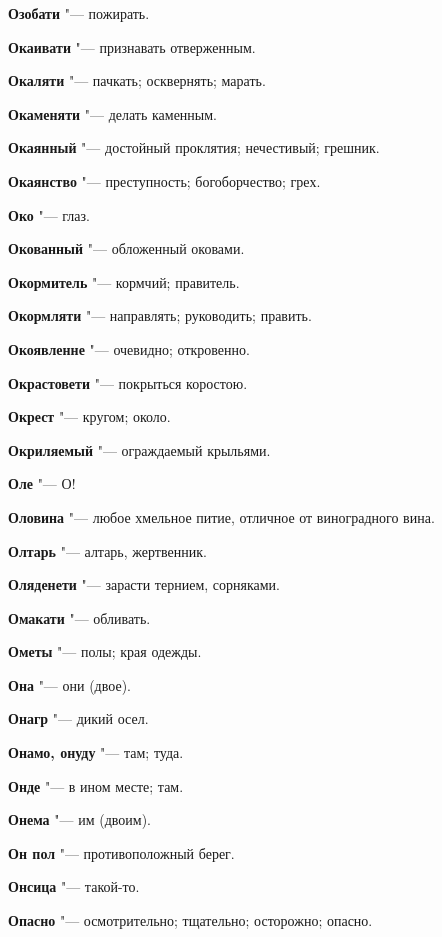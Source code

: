 \begin{mymulticols}
\noindent\textbf{Озобати} "--- пожирать. 

\noindent\textbf{Окаивати} "--- признавать отверженным. 

\noindent\textbf{Окаляти} "--- пачкать; осквернять; марать. 

\noindent\textbf{Окаменяти} "--- делать каменным. 

\noindent\textbf{Окаянный} "--- достойный проклятия; нечестивый; грешник. 

\noindent\textbf{Окаянство} "--- преступность; богоборчество; грех. 

\noindent\textbf{Око} "--- глаз. 

\noindent\textbf{Окованный} "--- обложенный оковами. 

\noindent\textbf{Окормитель} "--- кормчий; правитель. 

\noindent\textbf{Окормляти} "--- направлять; руководить; править. 

\noindent\textbf{Окоявленне} "--- очевидно; откровенно. 

\noindent\textbf{Окрастовети} "--- покрыться коростою. 

\noindent\textbf{Окрест} "--- кругом; около. 

\noindent\textbf{Окриляемый} "--- ограждаемый крыльями. 

\noindent\textbf{Оле} "--- О! 

\noindent\textbf{Оловина} "--- любое хмельное питие, отличное от виноградного вина. 

\noindent\textbf{Олтарь} "--- алтарь, жертвенник. 

\noindent\textbf{Оляденети} "--- зарасти тернием, сорняками. 

\noindent\textbf{Омакати} "--- обливать. 

\noindent\textbf{Ометы} "--- полы; края одежды. 

\noindent\textbf{Она} "--- они (двое). 

\noindent\textbf{Онагр} "--- дикий осел. 

\noindent\textbf{Онамо, онуду} "--- там; туда. 

\noindent\textbf{Онде} "--- в ином месте; там. 

\noindent\textbf{Онема} "--- им (двоим). 

\noindent\textbf{Он пол} "--- противоположный берег. 

\noindent\textbf{Онсица} "--- такой-то. 

\noindent\textbf{Опасно} "--- осмотрительно; тщательно; осторожно; опасно. 


\end{mymulticols}
